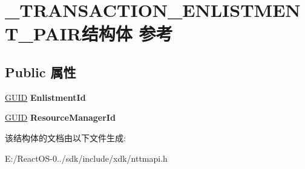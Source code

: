 \hypertarget{struct___t_r_a_n_s_a_c_t_i_o_n___e_n_l_i_s_t_m_e_n_t___p_a_i_r}{}\section{\+\_\+\+T\+R\+A\+N\+S\+A\+C\+T\+I\+O\+N\+\_\+\+E\+N\+L\+I\+S\+T\+M\+E\+N\+T\+\_\+\+P\+A\+I\+R结构体 参考}
\label{struct___t_r_a_n_s_a_c_t_i_o_n___e_n_l_i_s_t_m_e_n_t___p_a_i_r}
\subsection*{Public 属性}
\begin{DoxyCompactItemize}
\item 
\mbox{\label{struct___t_r_a_n_s_a_c_t_i_o_n___e_n_l_i_s_t_m_e_n_t___p_a_i_r_adc7090dadb50aab9397efe634bd38e59}} 
\hyperlink{interface_g_u_i_d}{G\+U\+ID} {\bfseries Enlistment\+Id}
\item 
\mbox{\label{struct___t_r_a_n_s_a_c_t_i_o_n___e_n_l_i_s_t_m_e_n_t___p_a_i_r_a91d833504f696e5e92f8f3b044cfa611}} 
\hyperlink{interface_g_u_i_d}{G\+U\+ID} {\bfseries Resource\+Manager\+Id}
\end{DoxyCompactItemize}


该结构体的文档由以下文件生成\+:\begin{DoxyCompactItemize}
\item 
E\+:/\+React\+O\+S-\/0../sdk/include/xdk/nttmapi.\+h\end{DoxyCompactItemize}
